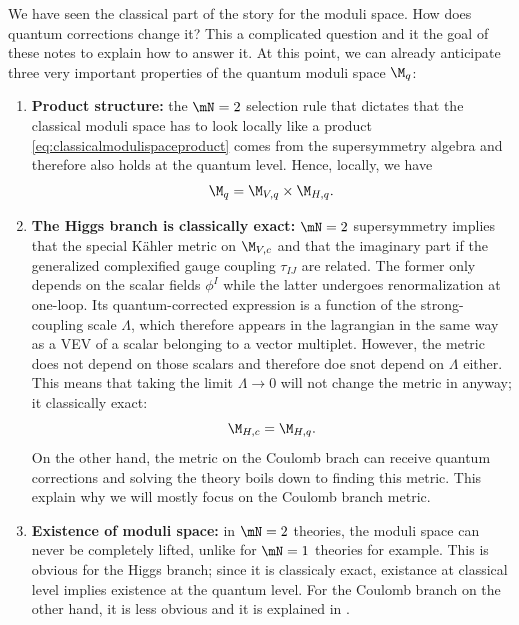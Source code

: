 \documentclass{worksheetclass}
\begin{document}
        We have seen the classical part of the story for the moduli space. How does quantum corrections change it? This a complicated question and it the goal of these notes to explain how to answer it. At this point, we can already anticipate three very important properties of the quantum moduli space $\M_q$:
        \begin{enumerate}
            \item \textbf{Product structure:} the $\mN=2$ selection rule that dictates that the classical moduli space has to look locally like a product \eqref{eq:classicalmodulispaceproduct} comes from the supersymmetry algebra and therefore also holds at the quantum level. Hence, locally, we have
            \begin{equation}
                \M_q = \M_{V,q}\times\M_{H,q}.\label{eq:quantummodulispaceproduct}
            \end{equation}
            \item \textbf{The Higgs branch is classically exact:} $\mN=2$ supersymmetry implies that the special Kähler metric on $\M_{V,c}$ and that the imaginary part if the generalized complexified gauge coupling $\tau_{IJ}$ are related. The former only depends on the scalar fields $\phi^I$ while the latter undergoes renormalization at one-loop. Its quantum-corrected expression is a function of the strong-coupling scale $\Lambda$, which therefore appears in the lagrangian in the same way as a VEV of a scalar belonging to a vector multiplet. However, the metric does not depend on those scalars and therefore doe snot depend on $\Lambda$ either. This means that taking the limit $\Lambda\to0$ will not change the metric in anyway; it classically exact:
            \begin{equation}
                \M_{H,c}=\M_{H,q}.
            \end{equation}
            On the other hand, the metric on the Coulomb brach can receive quantum corrections and solving the theory boils down to finding this metric. This explain why we will mostly focus on the Coulomb branch metric.
            \item \textbf{Existence of moduli space:} in $\mN=2$ theories, the moduli space can never be completely lifted, unlike for $\mN=1$ theories for example. This is obvious for the Higgs branch; since it is classicaly exact, existance at classical level implies existence at the quantum level. For the Coulomb branch on the other hand, it is less obvious and it is explained in \cite[p. 282]{bertolinisusy}.
        \end{enumerate}
\end{document}
